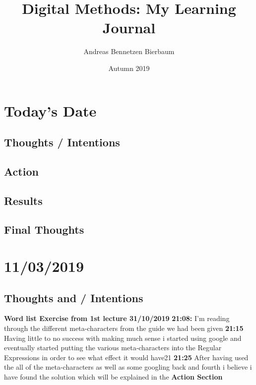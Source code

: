 \documentclass{article}
\title{Digital Methods: My Learning Journal}
\author{Andreas Bennetzen Bierbaum}
\date{Autumn 2019}
\begin{document}
\maketitle

\section{Today's Date}

\subsection{Thoughts / Intentions}
\subsection{Action}
\subsection{Results}
\subsection{Final Thoughts}



\pagebreak{}
\section{11/03/2019}
\subsection{Thoughts and / Intentions}
\textbf{Word list Exercise from 1st lecture 31/10/2019 }
\newline
\newline
\textbf{21:08:} I'm reading through the different meta-characters from the guide we had been given
\newline
\newline
\textbf{21:15} Having little to no success with making much sense i started using google and eventually started putting the various meta-characters into the Regular Expressions in order to see what effect it would have21
\newline
\newline
\textbf{21:25} After having used the all of the meta-characters as well as some googling back and fourth i believe i have found the solution which will be explained in the \textbf{Action Section}
\end{document}
